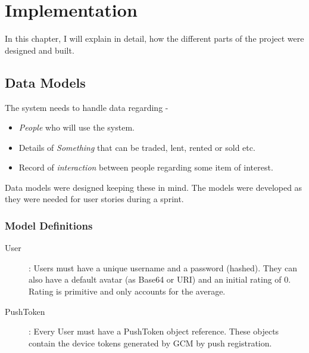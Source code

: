 \chapter{Implementation}
In this chapter, I will explain in detail, how the different parts of the project were designed and built.

\section{Data Models}

The system needs to handle data regarding - 

\begin{itemize}
	\item \textit{People} who will use the system.
	\item Details of \textit{Something} that can be traded, lent, rented or sold etc.
	\item Record of \textit{interaction} between people regarding some item of interest.	
\end{itemize}

Data models were designed keeping these in mind. The models were developed as they were needed for user stories during a sprint.

\subsection{Model Definitions}

\begin{description}
	\item [User] : Users must have a unique username and a password (hashed). They can also have a default avatar (as Base64 or URI) and an initial rating of 0. Rating is primitive and only accounts for the average.
	\item [PushToken] : Every User must have a PushToken object reference. These objects contain the device tokens generated by GCM by push registration.
\end{description}


